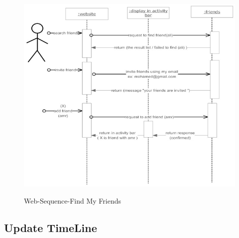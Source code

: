 \documentclass[12pt,a4paper,class,twoside,openany]{report}
\begin{document}
{\begin{figure}
\begin{center}
{\includegraphics[width=4 in,height=7 in]{4-7}
}
\caption{Web-Sequence-Find My Friends}
\label{fg:4-7}
\end{center}
\end{figure}
\subsection{Update TimeLine}
}
\end{document}
